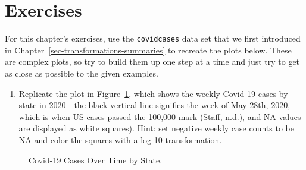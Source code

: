 \documentclass[
  letterpaper,
]{krantz}
\providecommand{\tightlist}{%
  \setlength{\itemsep}{0pt}\setlength{\parskip}{0pt}}\usepackage{longtable,booktabs,array}
\begin{document}
\section{Exercises}\label{exercises-5}

For this chapter's exercises, use the \texttt{covidcases} data set that
we first introduced in Chapter~\ref{sec-transformations-summaries} to
recreate the plots below. These are complex plots, so try to build them
up one step at a time and just try to get as close as possible to the
given examples.

\begin{enumerate}
\def\labelenumi{\arabic{enumi}.}
\tightlist
\item
  Replicate the plot in Figure~\ref{fig-covid-heatmap}, which shows the
  weekly Covid-19 cases by state in 2020 - the black vertical line
  signifies the week of May 28th, 2020, which is when US cases passed
  the 100,000 mark (Staff, n.d.), and NA values are displayed as white
  squares). Hint: set negative weekly case counts to be NA and color the
  squares with a log 10 transformation.
\end{enumerate}

\begin{figure}


\caption{\label{fig-covid-heatmap}Covid-19 Cases Over Time by State.}

\end{figure}%
\end{document}
